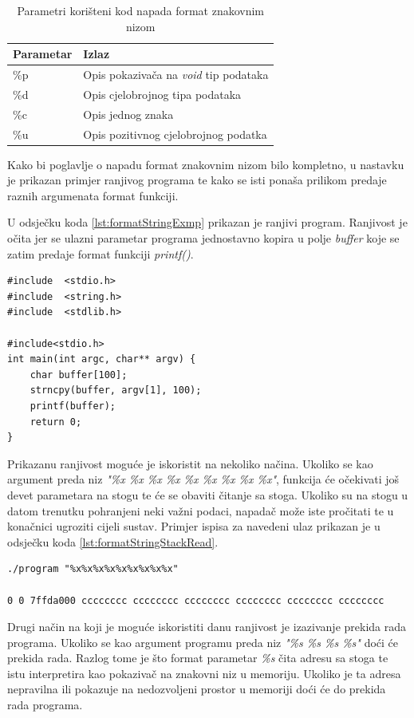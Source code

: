 \documentclass[times, utf8, diplomski, numeric]{fer}
\begin{document}
\begin{table}[htb]
\small
\caption{Parametri korišteni kod napada format znakovnim nizom}
\label{tbl:format_parameters}
\centering
\begin{tabular}{|l|p{8cm}|}
\hline
Parametar & Izlaz \\ \hline
\%p & Opis pokazivača na \emph{void} tip podataka \\ \hline
\%d & Opis cjelobrojnog tipa podataka \\ \hline
\%c & Opis jednog znaka \\ \hline
\%u & Opis pozitivnog cjelobrojnog podatka \\ \hline
\end{tabular}
\end{table}
Kako bi poglavlje o napadu format znakovnim nizom bilo kompletno, u nastavku je prikazan primjer ranjivog programa te kako se isti ponaša prilikom predaje raznih argumenata format funkciji.

U odsječku koda \ref{lst:formatStringExmp} prikazan je ranjivi program. Ranjivost je očita jer se ulazni parametar programa jednostavno kopira u polje \emph{buffer} koje se zatim predaje format funkciji \emph{printf()}. 

\begin{lstlisting}[frame=single, caption=Primjer ranjivog programa, label={lst:formatStringExmp}]
#include  <stdio.h>
#include  <string.h>
#include  <stdlib.h>

#include<stdio.h>
int main(int argc, char** argv) {
	char buffer[100];
	strncpy(buffer, argv[1], 100);
	printf(buffer);
	return 0;
}
\end{lstlisting}
Prikazanu ranjivost moguće je iskoristit na nekoliko načina. Ukoliko se kao argument preda niz \emph{"\%x \%x \%x \%x \%x \%x \%x \%x \%x"}, funkcija će očekivati još devet parametara na stogu te će se obaviti čitanje sa stoga. Ukoliko su na stogu u datom trenutku pohranjeni neki važni podaci, napadač može iste pročitati te u konačnici ugroziti cijeli sustav. Primjer ispisa za navedeni ulaz prikazan je u odsječku koda \ref{lst:formatStringStackRead}.

\begin{lstlisting}[frame=single, caption=Primjer rada program, label={lst:formatStringStackRead}]
./program "%x%x%x%x%x%x%x%x%x"

0 0 7ffda000 cccccccc cccccccc cccccccc cccccccc cccccccc cccccccc
\end{lstlisting}
Drugi način na koji je moguće iskoristiti danu ranjivost je izazivanje prekida rada programa. Ukoliko se kao argument programu preda niz \emph{"\%s \%s \%s \%s"} doći će prekida rada. Razlog tome je što format parametar \emph{\%s} čita adresu sa stoga te istu interpretira kao pokazivač na znakovni niz u memoriju. Ukoliko je ta adresa nepravilna ili pokazuje na nedozvoljeni prostor u memoriji doći će do prekida rada programa.
\end{document}
